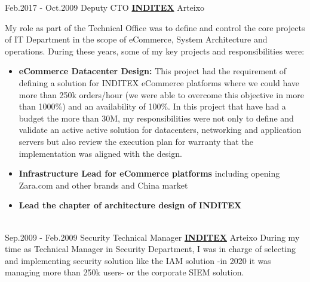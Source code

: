 \documentclass[a4paper]{twentysecondcv} %
\begin{document}
\begin{twenty}
    	{Feb.2017 -}
		{Oct.2009}
        {Deputy CTO}
        {\href{https://www.inditex.com/}{\textbf{INDITEX}}}
        {Arteixo}
        {
        My role as part of the Technical Office was to define and control the core projects of IT Department in the scope of eCommerce, System Architecture and operations. During these years, some of  my key projects and responsibilities were:
        \begin{itemize}
            \item \textbf{eCommerce Datacenter Design:} This project had the requirement of defining a solution for INDITEX eCommerce platforms where we could have more than 250k orders/hour (we were able to overcome this objective in more than 1000\%) and an availability of 100\%. In this project that have had a budget the more than 30M, my responsibilities were not only to define and validate an active active solution for datacenters, networking and application servers but also review the execution plan for warranty that the implementation was aligned with the design.\\
            \item \textbf{Infrastructure Lead for eCommerce platforms} including opening Zara.com and other brands and China market\\
            \item \textbf{Lead the chapter of architecture design of INDITEX}        
        \end{itemize}
        }
        \\
\twentyitem
    	{Sep.2009 -}
		{Feb.2009}
        {Security Technical Manager}
        {\href{https://www.inditex.com/}{\textbf{INDITEX}}}
        {Arteixo}
        {
        During my time as Technical Manager in Security Department, I was in charge of selecting and implementing security solution like the IAM solution -in 2020 it was managing more than 250k users- or the corporate SIEM solution. 
        }
        \\  
\end{twenty}
\newpage
\makeprofilepagetwo %
\end{document}
